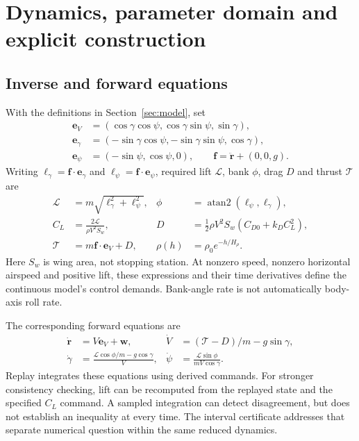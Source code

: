 \appendix
\section{Dynamics, parameter domain and explicit construction}
\label{app:dynamics}
\subsection{Inverse and forward equations}
With the definitions in Section~\ref{sec:model}, set
\begin{align}
\mathbf e_V&=(\cos\gamma\cos\psi,\cos\gamma\sin\psi,\sin\gamma),\\
\mathbf e_\gamma&=(-\sin\gamma\cos\psi,-\sin\gamma\sin\psi,\cos\gamma),\\
\mathbf e_\psi&=(-\sin\psi,\cos\psi,0),\qquad
\mathbf f=\ddot{\mathbf r}+(0,0,g).
\end{align}
Writing $\ell_\gamma=\mathbf f\cdot\mathbf e_\gamma$ and $\ell_\psi=\mathbf f\cdot\mathbf e_\psi$, required lift $\mathcal L$, bank $\phi$, drag $D$ and thrust $\mathcal T$ are
\begin{align}
\mathcal L&=m\sqrt{\ell_\gamma^2+\ell_\psi^2},&
\phi&=\operatorname{atan2}(\ell_\psi,\ell_\gamma),\\
C_L&=\frac{2\mathcal L}{\rho V^2 S_w},&
D&=\tfrac12\rho V^2 S_w(C_{D0}+k_D C_L^2),\\
\mathcal T&=m\mathbf f\cdot\mathbf e_V+D,&
\rho(h)&=\rho_0 e^{-h/H_\rho}.
\end{align}
Here $S_w$ is wing area, not stopping station. At nonzero speed, nonzero horizontal airspeed and positive lift, these expressions and their time derivatives define the continuous model's control demands. Bank-angle rate is not automatically body-axis roll rate.

The corresponding forward equations are
\begin{align}
\dot{\mathbf r}&=V\mathbf e_V+\mathbf w,&
\dot V&=(\mathcal T-D)/m-g\sin\gamma,\\
\dot\gamma&=\frac{\mathcal L\cos\phi/m-g\cos\gamma}{V},&
\dot\psi&=\frac{\mathcal L\sin\phi}{mV\cos\gamma}.
\end{align}
Replay integrates these equations using derived commands. For stronger consistency checking, lift can be recomputed from the replayed state and the specified $C_L$ command. A sampled integration can detect disagreement, but does not establish an inequality at every time. The interval certificate addresses that separate numerical question within the same reduced dynamics.

